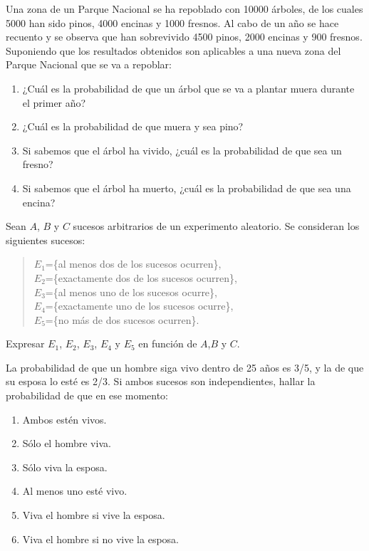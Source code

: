 {Una zona de un Parque Nacional se ha repoblado con 10000
árboles, de los cuales 5000 han sido pinos, 4000 encinas y 1000
fresnos. Al cabo de un año se hace recuento y se observa que han
sobrevivido 4500 pinos, 2000 encinas y 900 fresnos. Suponiendo que
los resultados obtenidos son aplicables a una nueva zona del Parque
Nacional que se va a repoblar:
\begin{enumerate}
\item ¿Cuál es la probabilidad de que un árbol que se va a plantar
muera durante el primer año?
\item ¿Cuál es la probabilidad de que muera y sea pino?
\item Si sabemos que el árbol ha vivido, ¿cuál es la probabilidad de
que sea un fresno?
\item Si sabemos que el árbol ha muerto, ¿cuál es la probabilidad de
que sea una encina?
\end{enumerate}
}
{}
{}


{Sean $A$, $B$ y $C$ sucesos arbitrarios de un experimento
aleatorio. Se consideran los siguientes sucesos:
\begin{quote}
    $E_1$=\{al menos dos de los sucesos ocurren\},\\
    $E_2$=\{exactamente dos de los sucesos ocurren\},\\
    $E_3$=\{al menos uno de los sucesos ocurre\},\\
    $E_4$=\{exactamente uno de los sucesos ocurre\},\\
    $E_5$=\{no m\'{a}s de dos sucesos ocurren\}.
\end{quote}
Expresar $E_1$, $E_2$, $E_3$, $E_4$ y $E_5$ en función de $A$,$B$ y $C$.
}
{}
{}


{La probabilidad de que un hombre siga vivo dentro de 25 años es 3/5, y la de que su esposa lo esté es 2/3. Si
ambos sucesos son independientes, hallar la probabilidad de que en ese momento:
\begin{enumerate}
\item Ambos estén vivos.
\item Sólo el hombre viva.
\item Sólo viva la esposa.
\item Al menos uno esté vivo.
\item Viva el hombre si vive la esposa.
\item Viva el hombre si no vive la esposa.
\end{enumerate}
}
{}
{}


